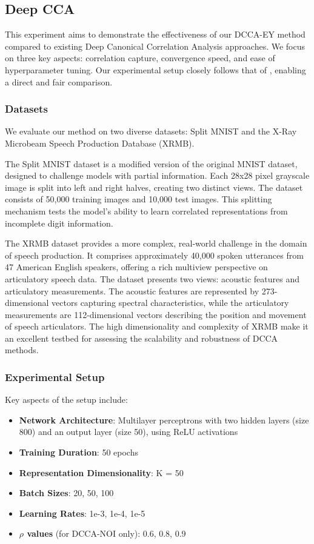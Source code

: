 \subsection{Deep CCA}\label{sec:experiments-DCCA}
This experiment aims to demonstrate the effectiveness of our DCCA-EY method compared to existing Deep Canonical Correlation Analysis approaches. We focus on three key aspects: correlation capture, convergence speed, and ease of hyperparameter tuning. Our experimental setup closely follows that of \citet{wang2015stochastic}, enabling a direct and fair comparison.

\subsubsection{Datasets}
We evaluate our method on two diverse datasets: Split MNIST and the X-Ray Microbeam Speech Production Database (XRMB).

The Split MNIST dataset is a modified version of the original MNIST dataset, designed to challenge models with partial information. Each 28x28 pixel grayscale image is split into left and right halves, creating two distinct views. The dataset consists of 50,000 training images and 10,000 test images. This splitting mechanism tests the model's ability to learn correlated representations from incomplete digit information.

The XRMB dataset provides a more complex, real-world challenge in the domain of speech production. It comprises approximately 40,000 spoken utterances from 47 American English speakers, offering a rich multiview perspective on articulatory speech data. The dataset presents two views: acoustic features and articulatory measurements. The acoustic features are represented by 273-dimensional vectors capturing spectral characteristics, while the articulatory measurements are 112-dimensional vectors describing the position and movement of speech articulators. The high dimensionality and complexity of XRMB make it an excellent testbed for assessing the scalability and robustness of DCCA methods.

\subsubsection{Experimental Setup}
Key aspects of the setup include:
\begin{itemize}
    \item \textbf{Network Architecture}: Multilayer perceptrons with two hidden layers (size 800) and an output layer (size 50), using ReLU activations
    \item \textbf{Training Duration}: 50 epochs
    \item \textbf{Representation Dimensionality}: K = 50
    \item \textbf{Batch Sizes}: 20, 50, 100
    \item \textbf{Learning Rates}: 1e-3, 1e-4, 1e-5
    \item \textbf{$\rho$ values} (for DCCA-NOI only): 0.6, 0.8, 0.9
\end{itemize}

